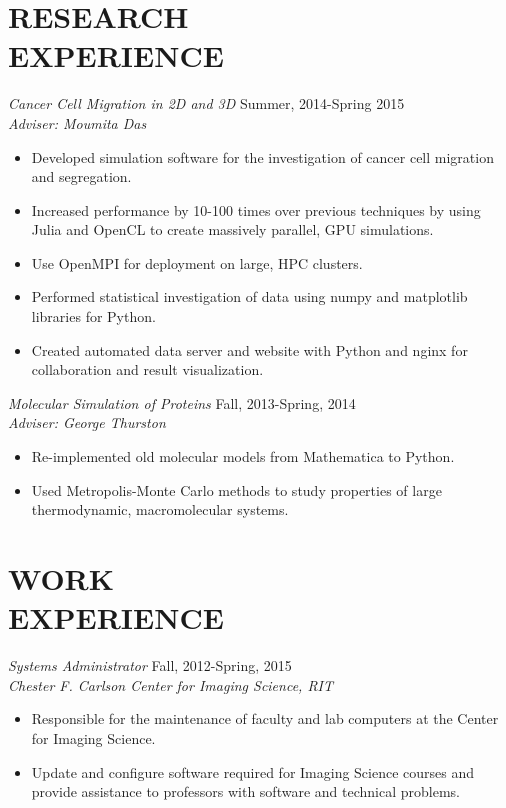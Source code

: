 \documentclass[margin]{res}
\begin{document}
\begin{resume}

\section{RESEARCH\\EXPERIENCE}
  {\sl Cancer Cell Migration in 2D and 3D} \hfill  Summer, 2014-Spring 2015\\
  {\sl Adviser: Moumita Das}\\                
  \begin{itemize}
    \item Developed simulation software for the investigation of cancer cell migration
      and segregation.
    \item Increased performance by 10-100 times over previous techniques by using
      Julia and OpenCL to create massively parallel, GPU simulations.
    \item Use OpenMPI for deployment on large, HPC clusters.
    \item Performed statistical investigation of data using numpy and matplotlib
      libraries for Python.
    \item  Created automated data server and website with Python and nginx for
      collaboration and result visualization.
  \end{itemize}

  {\sl Molecular Simulation of Proteins} \hfill   Fall, 2013-Spring, 2014 \\
  {\sl Adviser: George Thurston}\\                
  \begin{itemize}
    \item Re-implemented old molecular models from Mathematica to Python.
    \item Used Metropolis-Monte Carlo methods to study 
      properties of large thermodynamic, macromolecular systems.
  \end{itemize}


\section{WORK\\EXPERIENCE}

  {\sl Systems Administrator} \hfill            Fall, 2012-Spring, 2015 \\
  {\sl Chester F. Carlson Center for Imaging Science, RIT}\\
  \begin{itemize}
    \item Responsible for the maintenance of faculty and lab computers
      at the Center for Imaging Science.
    \item Update and configure software required for Imaging Science courses
      and provide assistance to professors with software and technical problems.
  \end{itemize}


\end{resume}
\end{document}
